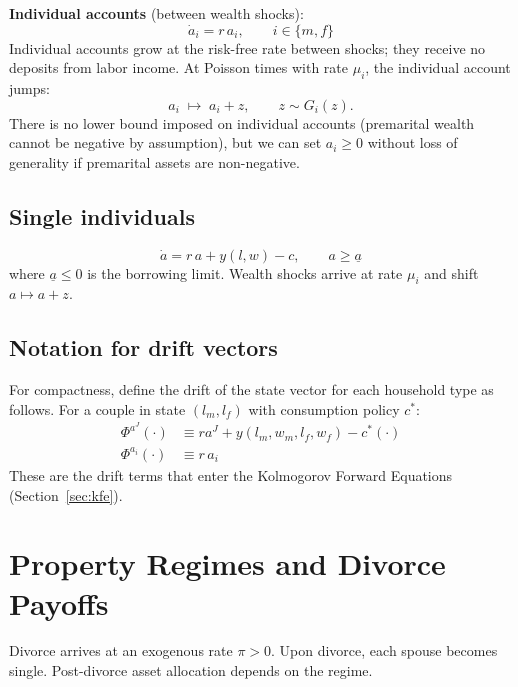 \documentclass[11pt]{article}
\newcommand{\aJ}{a^{J}}
\newcommand{\abar}{\underline{a}}
\begin{document}
\medskip
\noindent\textbf{Individual accounts} (between wealth shocks):
\begin{equation}
    \dot{a}_i = r\, a_i, \qquad i \in \{m, f\}
    \label{eq:ind_law}
\end{equation}
Individual accounts grow at the risk-free rate between shocks; they receive no deposits from labor income. At Poisson times with rate $\mu_i$, the individual account jumps:
\[
    a_i \;\mapsto\; a_i + z, \qquad z \sim G_i(z).
\]
There is no lower bound imposed on individual accounts (premarital wealth cannot be negative by assumption), but we can set $a_i \geq 0$ without loss of generality if premarital assets are non-negative.

\subsection{Single individuals}

\begin{equation}
    \dot{a} = r\,a + y(l, w) - c, \qquad a \geq \abar
    \label{eq:single_law}
\end{equation}
where $\abar \leq 0$ is the borrowing limit. Wealth shocks arrive at rate $\mu_i$ and shift $a \mapsto a + z$.

\subsection{Notation for drift vectors}

For compactness, define the drift of the state vector for each household type as follows. For a couple in state $(l_m, l_f)$ with consumption policy $c^*$:
\begin{align*}
    \Phi^{\aJ}(\cdot) &\equiv r\aJ + y(l_m, w_m, l_f, w_f) - c^*(\cdot) \\
    \Phi^{a_i}(\cdot) &\equiv r\, a_i
\end{align*}
These are the drift terms that enter the Kolmogorov Forward Equations (Section~\ref{sec:kfe}).


\section{Property Regimes and Divorce Payoffs}

Divorce arrives at an exogenous rate $\pi > 0$. Upon divorce, each spouse becomes single. Post-divorce asset allocation depends on the regime.
\end{document}
